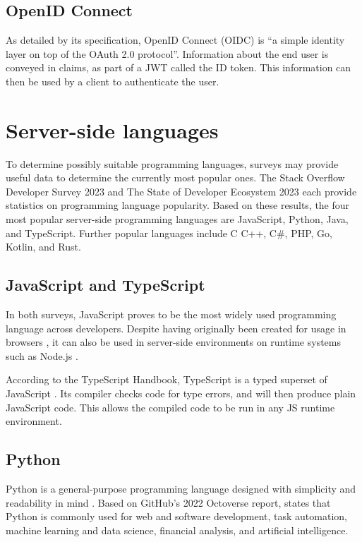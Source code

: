\subsection{OpenID Connect}
As detailed by its specification, OpenID Connect (OIDC) is ``a simple identity layer on top of the OAuth 2.0 protocol''. Information about the end user is conveyed in claims, as part of a JWT called the ID token. This information can then be used by a client to authenticate the user. \autocite{Sakimura2014} 

\section{Server-side languages}
To determine possibly suitable programming languages, surveys may provide useful data to determine the currently most popular ones. The Stack Overflow Developer Survey 2023 \autocite{StackOverflow2023} and The State of Developer Ecosystem 2023 \autocite{JetBrains2023} each provide statistics on programming language popularity. Based on these results, the four most popular server-side programming languages are JavaScript, Python, Java, and TypeScript. Further popular languages include   C C++, C\#, PHP, Go, Kotlin, and Rust.

\subsection{JavaScript and TypeScript}
In both surveys, JavaScript proves to be the most widely used programming language across developers. Despite having originally been created for usage in browsers \autocite{NCC1995}, it can also be used in server-side environments on runtime systems such as Node.js \autocite{OpenJSFoundation}.

According to the TypeScript Handbook, TypeScript is a typed superset of JavaScript \autocite{TypeScript2023}. Its compiler checks code for type errors, and will then produce plain JavaScript code. This allows the compiled code to be run in any JS runtime environment.

\subsection{Python}
Python is a general-purpose programming language designed with simplicity and readability in mind \autocite{Peters2004}. Based on GitHub's 2022 Octoverse report, \textcite{Scarlett2023} states that Python is commonly used for web and software development, task automation, machine learning and data science, financial analysis, and artificial intelligence.

